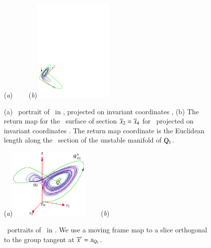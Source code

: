 \begin{figure}[ht]
\begin{center}
  (\textit{a})%
 ~~~~(\textit{b})\includegraphics[width=0.35\textwidth,clip=true]{../figs/CLEmfYYZ}
\end{center}
\caption{
(a) \Statesp\ portrait of \cLf\ in \reducedsp,
projected on invariant coordinates  ,
(b) The return map for the \Poincare\ surface of section $\overline{x}_2=\overline{x}_4$
for \cLe\ projected on invariant coordinates .
The return map coordinate is the Euclidean length along the
\Poincare\ section of the unstable manifold of $\mathrm{Q}_{1}$.
    }
\label{fig:CLEmfOld}
\end{figure}

%
\begin{figure}[ht]
\begin{center}
  (\textit{a})\includegraphics[width=0.35\textwidth,clip=true]{../figs/CLEperpReqb1}
~~~~(\textit{b}) %
\end{center}
\caption{
\Statesp\ portraits of \cLf\ in \reducedsp. We use a
moving frame map to a slice orthogonal to the group tangent
at  ${\overline{x}'}  = x_{\mathrm{Q}_{1}}$.
    }
\label{fig:CLEmfReqb1}
\end{figure}
%


